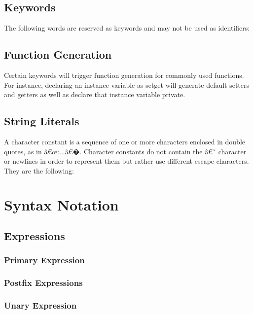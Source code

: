 \documentclass[12pt]{report}
\begin{document}
\subsection{Keywords}

\begin{doublespace}
The following words are reserved as keywords and may not be used as identifiers:
\end{doublespace}

\subsection{Function Generation}

\begin{doublespace}
Certain keywords will trigger function generation for commonly used functions. For instance, declaring an instance variable as setget will generate default setters and getters as well as declare that instance variable private.
\end{doublespace}

\subsection{String Literals}

\begin{doublespace}
A character constant is a sequence of one or more characters enclosed in double quotes, as in â€œ:...â€�. Character constants do not contain the â€˜ character or newlines in order to represent them but rather use different escape characters. They are the following:
\end{doublespace}

\section{Syntax Notation}

\subsection{Expressions}

\subsubsection{Primary Expression}
\subsubsection{Postfix Expressions}
\subsubsection{Unary Expression}
\end{document}
